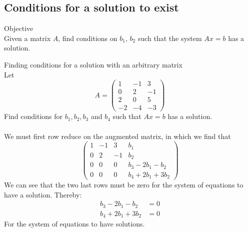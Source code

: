 \documentclass[journal, letterpaper]{IEEEtran}
\begin{document}
    \subsection{Conditions for a solution to exist}
    \begin{mybox}{Objective} \\ 
        Given a matrix $A$, find conditions on $b_1$, $b_2$ such that the system $Ax = b$ has a solution.
    \end{mybox}
    \begin{myboxg}{Finding conditions for a solution with an arbitrary matrix} \\
        Let $$A = \begin{pmatrix}
            1 & -1 & 3 \\ 
            0 & 2 & -1 \\
            2 & 0 & 5 \\
            -2 & -4 & -3
        \end{pmatrix}$$
        Find conditions for $b_1, b_2, b_3$ and $b_4$ such that $Ax = b$ has a solution. \\ \\
        We must first row reduce on the augmented matrix, 
        in which we find that
        $$ 
        \begin{pmatrix}
            1 & -1 & 3 & b_1 \\ 
            0 & 2 & -1 & b_2 \\
            0 & 0 & 0 & b_3 - 2b_1 - b_2 \\ 
            0 & 0 & 0 & b_4 + 2b_1 + 3b_2
        \end{pmatrix}
        $$
        We can see that the two last rows must be zero for the 
        system of equations to have a solution. Thereby:
        \begin{align*}
            b_3 - 2b_1 - b_2 &= 0 \\
            b_4 + 2b_1 + 3b_2 &= 0
        \end{align*}
        For the system of equations to have solutions.
    \end{myboxg}
\end{document}
